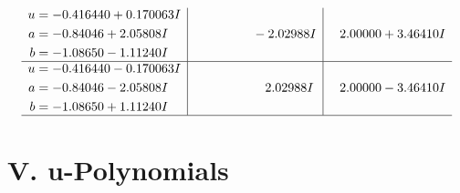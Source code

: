 \documentclass[1p]{elsarticle_modified}
\theoremstyle{definition}
\begin{document}
$$\begin{array}{c|c|c}
\begin{aligned}
u &= -0.416440 + 0.170063 I \\
a &= -0.84046 + 2.05808 I \\
b &= -1.08650 - 1.11240 I\end{aligned}
 & \phantom{-0.000000 } -2.02988 I & \phantom{-}2.00000 + 3.46410 I \\ \hline\begin{aligned}
u &= -0.416440 - 0.170063 I \\
a &= -0.84046 - 2.05808 I \\
b &= -1.08650 + 1.11240 I\end{aligned}
 & \phantom{-0.000000 -}2.02988 I & \phantom{-}2.00000 - 3.46410 I\\
 \hline 
 \end{array}$$\newpage
\newpage\renewcommand{\arraystretch}{1}
\centering \section*{ V. u-Polynomials}
\end{document}

